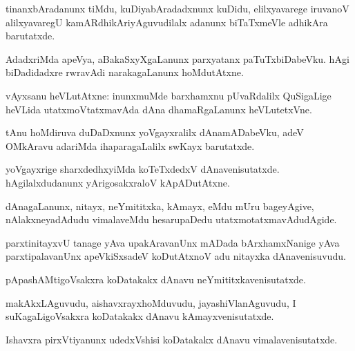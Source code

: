 \documentclass{article}
\begin{document}
\begin{mn}
tinanxbAradanunx tiMdu, kuDiyabAradadxnunx kuDidu, elilxyavarege iruvanoV alilxyavaregU 
kamARdhikAriyAguvudilalx adanunx biTaTxmeVle adhikAra barutatxde.
\end{mn}

\begin{mn}
AdadxriMda apeVya, aBakaSxyXgaLanunx parxyatanx paTuTxbiDabeVku. hAgi biDadidadxre rwravAdi 
narakagaLanunx hoMdutAtxne.
\end{mn}


\begin{mn}
vAyxsanu heVLutAtxne: inunxmuMde barxhamxnu pUvaRdalilx QuSigaLige heVLida 
utatxmoVtatxmavAda dAna dhamaRgaLanunx  heVLutetxVne.
\end{mn}

\begin{mn}
tAnu hoMdiruva duDaDxnunx yoVgayxralilx dAnamADabeVku, adeV OMkAravu adariMda ihaparagaLalilx 
swKayx barutatxde.
\end{mn}

\begin{mn}
yoVgayxrige sharxdedhxyiMda koTeTxdedxV dAnavenisutatxde. hAgilalxdudanunx yArigosakxraloV 
kApADutAtxne.
\end{mn}

\begin{mn}
dAnagaLanunx, nitayx, neYmititxka, kAmayx, eMdu mUru bageyAgive, nAlakxneyadAdudu vimalaveMdu 
hesarupaDedu utatxmotatxmavAdudAgide.
\end{mn}

\begin{mn}
parxtinitayxvU tanage yAva upakAravanUnx mADada bArxhamxNanige yAva parxtipalavanUnx 
apeVkiSxsadeV koDutAtxnoV adu nitayxka dAnavenisuvudu.
\end{mn}

\begin{mn}
pApashAMtigoVsakxra koDatakakx dAnavu neYmititxkavenisutatxde.
\end{mn}

\begin{mn}
makAkxLAguvudu, aishavxrayxhoMduvudu, jayashiVlanAguvudu, I suKagaLigoVsakxra koDatakakx dAnavu 
kAmayxvenisutatxde.
\end{mn}

\begin{mn}
Ishavxra pirxVtiyanunx udedxVshisi koDatakakx dAnavu vimalavenisutatxde.
\end{mn}
\end{document}
